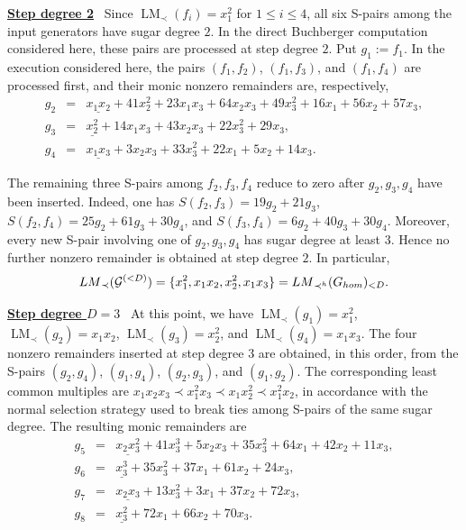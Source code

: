 \documentclass{article}
\theoremstyle{definition}
\theoremstyle{plain}
\theoremstyle{plain}
\theoremstyle{plain}
\theoremstyle{plain}
\numberwithin{equation}{subsection}
\begin{document}
\medskip

\noindent \underline{\textbf{Step degree 2}}~
Since $\operatorname{LM}_{\prec}(f_i)=x_1^2$ for $1\leq i \leq 4$, all six S-pairs among the input generators have sugar degree $2$.
In the direct Buchberger computation considered here, these pairs are processed at step degree $2$.
Put $g_1:=f_1$.
In the execution considered here, the pairs
$(f_1,f_2)$, $(f_1,f_3)$, and $(f_1,f_4)$ are processed first,
and their monic nonzero remainders are, respectively,
{\small
\begin{eqnarray*}
g_2&=&
\underline{x_1x_2}+41x_2^2+23x_1x_3+64x_2x_3+49x_3^2
 +16x_1+56x_2+57x_3,\\
g_3&=&
\underline{x_2^2}+14x_1x_3+43x_2x_3+22x_3^2+29x_3,\\
g_4&=&
\underline{x_1x_3}+3x_2x_3+33x_3^2+22x_1+5x_2+14x_3.
\end{eqnarray*}}

\noindent The remaining three S-pairs among $f_2,f_3,f_4$ reduce to zero after $g_2,g_3,g_4$ have been inserted.
Indeed, one has $S(f_2,f_3)=19g_2+21g_3$, $S(f_2,f_4)=25g_2+61g_3+30g_4$, and $S(f_3,f_4)=6g_2+40g_3+30g_4$.
Moreover, every new S-pair involving one of $g_2,g_3,g_4$ has sugar degree at least $3$.
Hence no further nonzero remainder is obtained at step degree $2$.
In particular,
\[
{\rm LM}_{\prec}(\mathcal G^{(<D)})
=
\{x_1^2,x_1x_2,x_2^2,x_1x_3\}
=
{\rm LM}_{\prec^h}(G_{\rm hom})_{<D}.
\]

\noindent \underline{\textbf{Step degree $D=3$}}~
At this point, we have $\operatorname{LM}_{\prec}(g_1)=x_1^2$, $\operatorname{LM}_{\prec}(g_2)=x_1x_2$, $\operatorname{LM}_{\prec}(g_3)=x_2^2$, and $\operatorname{LM}_{\prec}(g_4)=x_1x_3$.
The four nonzero remainders inserted at step degree $3$ are obtained, in this order, from the S-pairs $(g_2,g_4)$, $(g_1,g_4)$, $(g_2,g_3)$, and $(g_1,g_2)$.
The corresponding least common multiples are $x_1x_2x_3 \prec x_1^2x_3 \prec x_1x_2^2 \prec x_1^2x_2$, in accordance with the normal selection strategy used to break ties among S-pairs of the same sugar degree.
The resulting monic remainders are
{\small
\begin{eqnarray*}
g_5&=&
\underline{x_2x_3^2}+41x_3^3+5x_2x_3+35x_3^2
 +64x_1+42x_2+11x_3,\\
g_6&=&
\underline{x_3^3}+35x_3^2+37x_1+61x_2+24x_3,\\
g_7&=&
\underline{x_2x_3}+13x_3^2+3x_1+37x_2+72x_3,\\
g_8&=&
\underline{x_3^2}+72x_1+66x_2+70x_3.
\end{eqnarray*}}
\end{document}
